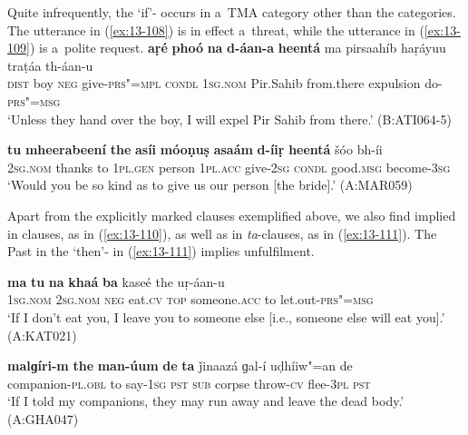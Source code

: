 Quite infrequently, the `if'- occurs in a~TMA category other than the  categories. The utterance in (\ref{ex:13-108}) is in effect a~threat, while the utterance in (\ref{ex:13-109}) is a~polite request.
\ea
\label{ex:13-108}
\gll \textbf{aṛé} \textbf{phoó} \textbf{na} \textbf{d-áan-a} \textbf{heentá} ma pirsaahíb haṛáyuu traṭáa th-áan-u\\
 \textsc{dist}{\protect\footnotemark} boy \textsc{neg} give-\textsc{prs"=mpl} \textsc{condl} \textsc{1sg.nom} Pir.Sahib from.there expulsion do-\textsc{prs"=msg}\\
\glt `Unless they hand over the boy, I will expel Pir Sahib from there.' (B:ATI064-5)

\ex
\label{ex:13-109}
\gll \textbf{tu} \textbf{mheerabeení} \textbf{the} \textbf{asíi} \textbf{móoṇuṣ} \textbf{asaám} \textbf{d-íiṛ} \textbf{ heentá} šóo bh-íi  \\
\textsc{2sg.nom} thanks to \textsc{1pl.gen} person \textsc{1pl.acc} give-\textsc{2sg}  \textsc{condl} good.\textsc{msg} become-\textsc{3sg} \\
\glt `Would you be so kind as to give us our person [the bride].' (A:MAR059) 
\z



Apart from the explicitly marked  clauses exemplified above, we also find  implied in  clauses, as in (\ref{ex:13-110}), as well as in \textit{ta}-clauses, as in (\ref{ex:13-111}). The Past  in the `then'- in (\ref{ex:13-111}) implies unfulfilment.

\begin{exe}
\ex
\label{ex:13-110}
\gll \textbf{ma} \textbf{tu} \textbf{na} \textbf{khaá} \textbf{ba} kaseé the uṛ-áan-u\\
\textsc{1sg.nom} \textsc{2sg.nom} \textsc{neg} eat.\textsc{cv} \textsc{top} someone.\textsc{acc} to let.out-\textsc{prs"=msg}\\
\glt `If I don't eat you, I leave you to someone else [i.e., someone else will eat you].' (A:KAT021)

\ex
\label{ex:13-111}
\gll \label{bkm:Ref190830313}\textbf{malɡíri-m} \textbf{the} \textbf{man-úum} \textbf{de} \textbf{ta} ǰinaazá  ɡal-í uḍhíiw"=an de\\
companion-\textsc{pl.obl} to say-\textsc{1sg} \textsc{ pst} \textsc{sub} corpse throw-\textsc{cv} flee-\textsc{3pl} \textsc{ pst}\\
\glt `If I told my companions, they may run away and leave the dead body.' (A:GHA047) 
\end{exe}

